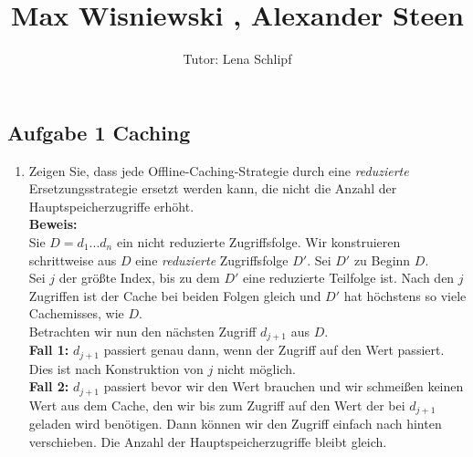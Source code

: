 \documentclass[11pt,a4paper,ngerman]{article}
\author{Tutor: Lena Schlipf}
\date{}
\title{Max Wisniewski , Alexander Steen}
\begin{document}

\maketitle
\thispagestyle{fancy}

\subsection*{Aufgabe 1 \mdseries Caching}

\begin{enumerate}[\bfseries (a)]

\item Zeigen Sie, dass jede Offline-Caching-Strategie durch eine \emph{reduzierte} Ersetzungsstrategie ersetzt werden kann, die nicht die Anzahl der Hauptspeicherzugriffe erhöht.\\

\textbf{Beweis:}\\

Sie $D = d_1...d_n$ ein nicht reduzierte Zugriffsfolge. Wir konstruieren schrittweise aus $D$ eine \emph{reduzierte} Zugriffsfolge $D'$. Sei $D'$ zu Beginn $D$.\\

Sei $j$ der größte Index, bis zu dem $D'$ eine reduzierte Teilfolge ist. Nach den $j$ Zugriffen ist der Cache bei beiden Folgen gleich und $D'$ hat höchstens so viele Cachemisses, wie $D$.\\

Betrachten wir nun den nächsten Zugriff $d_{j+1}$ aus $D$.\\

\textbf{Fall 1:} $d_{j+1}$ passiert genau dann, wenn der Zugriff auf den Wert passiert. Dies ist nach Konstruktion von $j$ nicht möglich.\\

\textbf{Fall 2:} $d_{j+1}$ passiert bevor wir den Wert brauchen und wir schmeißen keinen Wert aus dem Cache, den wir bis zum Zugriff auf den Wert der bei $d_{j+1}$ geladen wird benötigen. Dann können wir den Zugriff einfach nach hinten verschieben. Die Anzahl der Hauptspeicherzugriffe bleibt gleich.\\


\end{enumerate}
\end{document}
